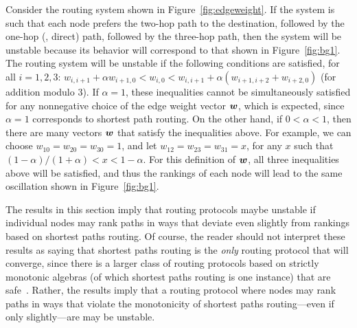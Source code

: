 \begin{example}
Consider the routing system shown in Figure~\ref{fig:edgeweight}.  If
the system is such that each node prefers the two-hop path to the
destination, followed by the one-hop (\ie, direct) path, followed by the
three-hop path, then the system will be unstable because its behavior
will correspond to that shown  
in Figure~\ref{fig:bg1}.  The routing system will be unstable if the
following conditions are satisfied, for all $i=1,2,3$:
$w_{i,i+1} + \alpha w_{i+1,0}  <  w_{i,0} < w_{i,i+1} +
\alpha(w_{i+1,i+2} + w_{i+2,0})$ (for addition modulo $3$).
If $\alpha = 1$, these inequalities cannot be simultaneously satisfied
for any nonnegative choice of the edge weight vector $\boldsymbol{w}$, which is
expected, since $\alpha =1$ corresponds to shortest path
routing.  On the other hand, if $0 < \alpha < 1$, then there are many vectors
$\boldsymbol{w}$ that satisfy the inequalities above.  For example, we can choose
$w_{10} = w_{20} = w_{30} = 1$, and let $w_{12} = w_{23} = w_{31} =
x$, for any $x$ such that $(1 - \alpha)/(1+\alpha) < x < 1-\alpha$.
For this definition of $\boldsymbol{w}$, all three inequalities above will be
satisfied, and thus the rankings of each node will lead to the same
oscillation shown in Figure~\ref{fig:bg1}.
\end{example}

The results in this section imply that routing protocols maybe unstable
if individual nodes may rank paths in ways that deviate even slightly
from rankings based on shortest paths routing.  Of course, the reader
should not interpret these results as saying that shortest paths routing
is the {\em only} routing protocol that will converge, since there is a
larger class of routing protocols based on strictly monotonic algebras
(of which shortest paths routing is one instance) that are
safe~\cite{Griffin2005}.  Rather, the results imply that a routing
protocol where nodes may rank paths in ways that violate the
monotonicity of shortest paths routing---even if only slightly---are may
be unstable.

